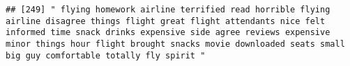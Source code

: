 \documentclass[
]{article}
\begin{document}
\begin{verbatim}
## [249] " flying homework airline terrified read horrible flying airline disagree things flight great flight attendants nice felt informed time snack drinks expensive side agree reviews expensive minor things hour flight brought snacks movie downloaded seats small big guy comfortable totally fly spirit "                                                                                                                                                                                                                                                                                                                                                                                                                                                                                                                                                                                                                                                                                                                                                                                                                                                                                                                                                                                                                                                                                                                                                                                                                                                                                                                                                                                                                                                                                       

\end{verbatim}
\end{document}
